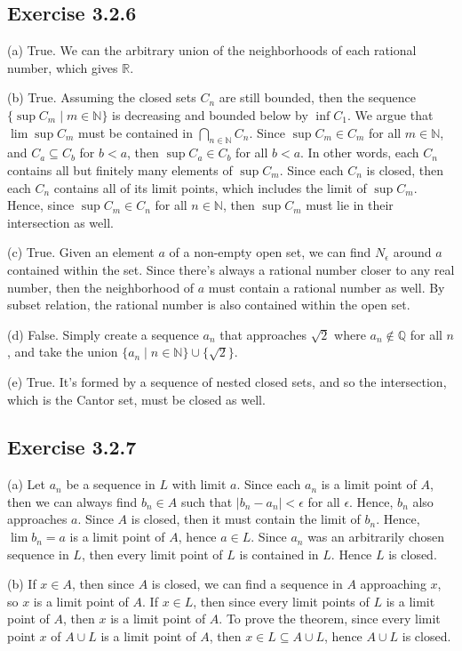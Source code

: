 \documentclass{book}
\begin{document}
\subsection*{Exercise 3.2.6}
(a)
True. We can the arbitrary union of the neighborhoods of each rational number, which gives $\mathbb{R}$.

\noindent
(b)
True. Assuming the closed sets $C_n$ are still bounded, then the sequence $\{\sup C_m \mid m \in \mathbb{N}\}$ is decreasing and bounded below by $\inf C_1$. We argue that $\lim \sup C_m$ must be contained in $\bigcap_{n \in \mathbb{N}} C_n$. Since $\sup C_m \in C_m$ for all $m \in \mathbb{N}$, and $C_a \subseteq C_b$ for $b < a$, then $\sup C_a \in C_b$ for all $b < a$. In other words, each $C_n$ contains all but finitely many elements of $\sup C_m$. Since each $C_n$ is closed, then each $C_n$ contains all of its limit points, which includes the limit of $\sup C_m$. Hence, since $\sup C_m \in C_n$ for all $n \in \mathbb{N}$, then $\sup C_m$ must lie in their intersection as well.

\noindent
(c)
True. Given an element $a$ of a non-empty open set, we can find $N_\epsilon$ around $a$ contained within the set. Since there's always a rational number closer to any real number, then the neighborhood of $a$ must contain a rational number as well. By subset relation, the rational number is also contained within the open set.

\noindent
(d)
False. Simply create a sequence $a_n$ that approaches $\sqrt{2}$ where $a_n \not \in \mathbb{Q}$ for all $n$, and take the union $\{ a_n \mid n \in \mathbb{N} \} \cup \{ \sqrt{2} \}$.

\noindent
(e)
True. It's formed by a sequence of nested closed sets, and so the intersection, which is the Cantor set, must be closed as well.

\subsection*{Exercise 3.2.7}
(a)
Let $a_n$ be a sequence in $L$ with limit $a$. Since each $a_n$ is a limit point of $A$, then we can always find $b_n \in A$ such that $|b_n - a_n| < \epsilon$ for all $\epsilon$. Hence, $b_n$ also approaches $a$. Since $A$ is closed, then it must contain the limit of $b_n$. Hence, $\lim b_n = a$ is a limit point of $A$, hence $a \in L$. Since $a_n$ was an arbitrarily chosen sequence in $L$, then every limit point of $L$ is contained in $L$. Hence $L$ is closed.

\noindent
(b)
If $x \in A$, then since $A$ is closed, we can find a sequence in $A$ approaching $x$, so $x$ is a limit point of $A$. If $x \in L$, then since every limit points of $L$ is a limit point of $A$, then $x$ is a limit point of $A$. To prove the theorem, since every limit point $x$ of $A \cup L$ is a limit point of $A$, then $x \in L \subseteq A \cup L$, hence $A \cup L$ is closed.
\end{document}

